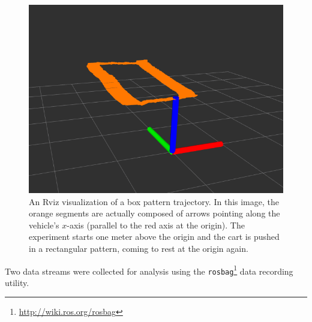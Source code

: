 \begin{figure}
  \centering
    \includegraphics[width=\textwidth]{good_box_5_cropped}
  \caption[Rviz Visualization of a Box Pattern Trajectory]{An Rviz visualization of a box pattern trajectory. In this image, the orange segments are actually composed of arrows pointing along the vehicle's $x$-axis (parallel to the red axis at the origin). The experiment starts one meter above the origin and the cart is pushed in a rectangular pattern, coming to rest at the origin again.}
  \label{fig:sensor_mount_vicon}
\end{figure}


Two data streams were collected for analysis using the \texttt{rosbag}\footnote{\url{http://wiki.ros.org/rosbag}} data recording utility.
